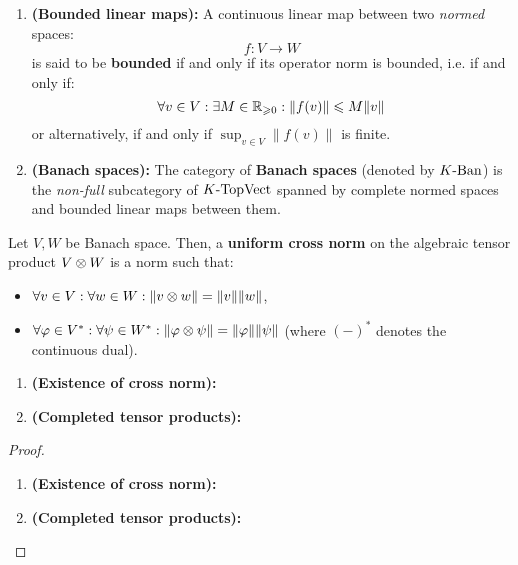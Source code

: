             \begin{definition} \label{def: banach_spaces}
                \noindent
                \begin{enumerate}
                    \item \textbf{(Bounded linear maps):} A continuous linear map between two \textit{normed} spaces:
                        $$f: V \to W$$
                    is said to be \textbf{bounded} if and only if its operator norm is bounded, i.e. if and only if:
                        $$\forall v \in V: \exists M \in \mathbb{R}_{\geqslant 0}: \|f(v)\| \leqslant M \|v\|$$
                    or alternatively, if and only if $\sup_{v \in V} \|f(v)\|$ is finite.
                    \item \textbf{(Banach spaces):} The category of \textbf{Banach spaces} (denoted by $K\text{-}\mathrm{Ban}$) is the \textit{non-full} subcategory of $K\text{-}\mathrm{Top}\mathrm{Vect}$ spanned by complete normed spaces and bounded linear maps between them.
                \end{enumerate}
            \end{definition}
            \begin{definition} \label{def: cross_norms}
                Let $V, W$ be Banach space. Then, a \textbf{uniform cross norm} on the algebraic tensor product $V \tensor W$ is a norm such that:
                    \begin{itemize}
                        \item $\forall v \in V: \forall w \in W: \|v \tensor w\| = \|v\| \|w\|$,
                        \item $\forall \varphi \in V^*: \forall \psi \in W^*: \|\varphi \tensor \psi\| = \|\varphi\| \|\psi\|$ (where $(-)^*$ denotes the continuous dual).
                    \end{itemize}
            \end{definition}
            \begin{proposition} \label{prop: tensor_product_of_banach_spaces}
                \noindent
                \begin{enumerate}
                    \item \textbf{(Existence of cross norm):}
                    \item \textbf{(Completed tensor products):}
                \end{enumerate}
            \end{proposition}
                \begin{proof}
                    \noindent
                    \begin{enumerate}
                        \item \textbf{(Existence of cross norm):}
                        \item \textbf{(Completed tensor products):}
                    \end{enumerate}
                \end{proof}
            
